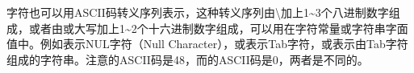 字符也可以用ASCII码转义序列表示，这种转义序列由\textbackslash{}加上1\textasciitilde{}\BookSplit{}3个八进制数字组成，或者由或大写加上1\textasciitilde{}\BookSplit{}2个十六进制数字组成，可以用在字符常量或字符串字面值中。例如表示NUL字符（Null Character），或表示Tab字符，\BookCode{\BookQuoteChar{}\textbackslash{}11\BookQuoteChar{}}或表示由Tab字符组成的字符串。注意的ASCII码是48，而的ASCII码是0，两者是不同的。

